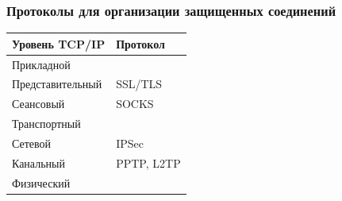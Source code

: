 \begin{frame}
    \frametitle{Протоколы для организации защищенных соединений}

    \begin{table}
        \centering
        \begin{tabular}{|l|l|}
            \hline\hline
            Уровень TCP/IP              & Протокол  \\
            \hline\hline
            Прикладной                  &           \\ \hline            
            Представительный            & SSL/TLS   \\ \hline            
            Сеансовый                   & SOCKS     \\ \hline            
            Транспортный                &           \\ \hline            
            Сетевой                     & IPSec     \\ \hline
            Канальный                   & PPTP, L2TP\\ \hline            
            Физический                  &           \\ \hline
        \end{tabular}
    \end{table}    
\end{frame}


